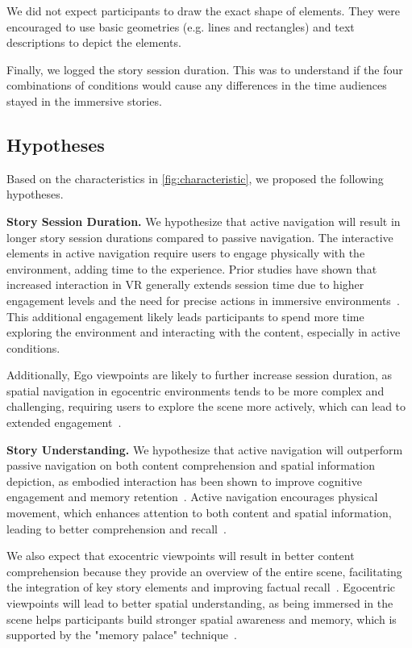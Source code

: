 We did not expect participants to draw the exact shape of elements.
They were encouraged to use basic geometries (e.g. lines and rectangles) and text descriptions to depict the elements.
 

Finally, we logged the story session duration. This was to understand if the four combinations of conditions would cause any differences in the time audiences stayed in the immersive stories.




\subsection{Hypotheses}
\label{subsec:hypotheses}
Based on the characteristics in \autoref{fig:characteristic}, we proposed the following hypotheses.


\textbf{Story Session Duration.}
We hypothesize that active navigation will result in longer story session durations compared to passive navigation. The interactive elements in active navigation require users to engage physically with the environment, adding time to the experience. Prior studies have shown that increased interaction in VR generally extends session time due to higher engagement levels and the need for precise actions in immersive environments~\cite{lages2018move, servotte2020vr}. This additional engagement likely leads participants to spend more time exploring the environment and interacting with the content, especially in active conditions.

Additionally, Ego viewpoints are likely to further increase session duration, as spatial navigation in egocentric environments tends to be more complex and challenging, requiring users to explore the scene more actively, which can lead to extended engagement~\cite{van2018virtual}.

\textbf{Story Understanding.} 
We hypothesize that active navigation will outperform passive navigation on both content comprehension and spatial information depiction, as embodied interaction has been shown to improve cognitive engagement and memory retention~\cite{wilson2002six, makransky2019adding}. Active navigation encourages physical movement, which enhances attention to both content and spatial information, leading to better comprehension and recall~\cite{servotte2020vr}. 

We also expect that exocentric viewpoints will result in better content comprehension because they provide an overview of the entire scene, facilitating the integration of key story elements and improving factual recall~\cite{yang2018maps}.
Egocentric viewpoints will lead to better spatial understanding, as being immersed in the scene helps participants build stronger spatial awareness and memory, which is supported by the "memory palace" technique~\cite{legge2012building, krokos2019virtual}.


